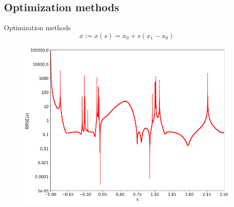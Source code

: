 \documentclass{beamer}
\begin{document}
\subsection{Optimization methods}
\begin{frame}{Optimization methods}
    \begin{equation*}
        x := x(s) = x_0 + s(x_1 - x_0)
    \end{equation*}
    \begin{figure}[h]
        \includegraphics[scale=0.28]{img/slide/PES_LS_[-1,2.5]_view2.png}
        \label{fig:conint}
    \end{figure}
\end{frame}
\end{document}
